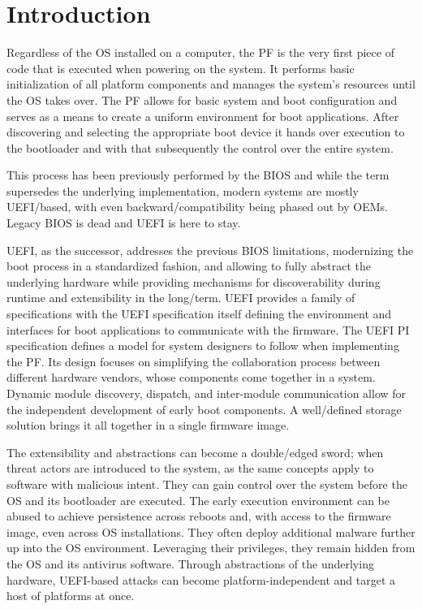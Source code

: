 

\chapter{Introduction}
\label{sec:introduction}

Regardless of the \ac{OS} installed on a computer, the \ac{PF} is the very first piece of code that is executed when powering on the system.
It performs basic initialization of all platform components and manages the system's resources until the \ac{OS} takes over.
The \ac{PF} allows for basic system and boot configuration and serves as a means to create a uniform environment for boot applications.
After discovering and selecting the appropriate boot device it hands over execution to the bootloader and with that subsequently the control over the entire system.

This process has been previously performed by the \ac{BIOS} and while the term supersedes the underlying implementation, modern systems are mostly \ac{UEFI}\-/based, with even backward\-/compatibility being phased out by \acp{OEM}.
Legacy \ac{BIOS} is dead and \ac{UEFI} is here to stay.

\ac{UEFI}, as the successor, addresses the previous \ac{BIOS} limitations, modernizing the boot process in a standardized fashion, and allowing to fully abstract the underlying hardware while providing mechanisms for discoverability during runtime and extensibility in the long\-/term.
\ac{UEFI} provides a family of specifications with the \ac{UEFI} specification itself defining the environment and interfaces for boot applications to communicate with the firmware.
The \ac{UEFI} \acf{PI} specification defines a model for system designers to follow when implementing the \ac{PF}.
Its design focuses on simplifying the collaboration process between different hardware vendors, whose components come together in a system.
Dynamic module discovery, dispatch, and inter-module communication allow for the independent development of early boot components.
A well\-/defined storage solution brings it all together in a single firmware image.

The extensibility and abstractions can become a double\-/edged sword; when threat actors are introduced to the system, as the same concepts apply to software with malicious intent.
They can gain control over the system before the \ac{OS} and its bootloader are executed.
The early execution environment can be abused to achieve persistence across reboots and, with access to the firmware image, even across \ac{OS} installations.
They often deploy additional malware further up into the \ac{OS} environment.
Leveraging their privileges, they remain hidden from the \ac{OS} and its antivirus software.
Through abstractions of the underlying hardware, \ac{UEFI}-based attacks can become platform-independent and target a host of platforms at once.

